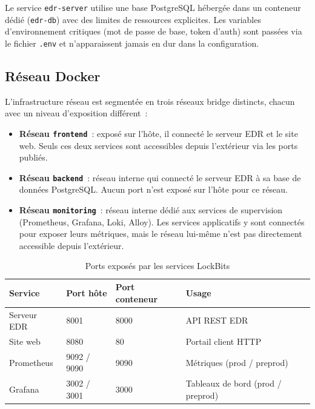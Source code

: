 Le service \texttt{edr-server} utilise une base PostgreSQL hébergée dans un
conteneur dédié (\texttt{edr-db}) avec des limites de ressources explicites.
Les variables d'environnement critiques (mot de passe de base, token d'auth)
sont passées via le fichier \texttt{.env} et n'apparaissent jamais en dur dans
la configuration.

\subsection{Réseau Docker}

L'infrastructure réseau est segmentée en trois réseaux bridge distincts,
chacun avec un niveau d'exposition différent~:

\begin{itemize}
  \item \textbf{Réseau \texttt{frontend}}~: exposé sur l'hôte, il connecté le
    serveur EDR et le site web. Seuls ces deux services sont accessibles
    depuis l'extérieur via les ports publiés.
  \item \textbf{Réseau \texttt{backend}}~: réseau interne qui connecté le
    serveur EDR à sa base de données PostgreSQL. Aucun port n'est exposé sur
    l'hôte pour ce réseau.
  \item \textbf{Réseau \texttt{monitoring}}~: réseau interne dédié aux
    services de supervision (Prometheus, Grafana, Loki, Alloy). Les services
    applicatifs y sont connectés pour exposer leurs métriques, mais le réseau
    lui-même n'est pas directement accessible depuis l'extérieur.
\end{itemize}

\begin{table}[H]
\centering
\caption{Ports exposés par les services LockBits}
\label{tab:ports-exposes}
\begin{tabularx}{\textwidth}{l l l X}
\toprule
\textbf{Service} & \textbf{Port hôte} & \textbf{Port conteneur} & \textbf{Usage} \\
\midrule
Serveur EDR & 8001 & 8000 & API REST EDR \\
Site web & 8080 & 80 & Portail client HTTP \\
Prometheus & 9092 / 9090 & 9090 & Métriques (prod / preprod) \\
Grafana & 3002 / 3001 & 3000 & Tableaux de bord (prod / preprod) \\
\bottomrule
\end{tabularx}
\end{table}

